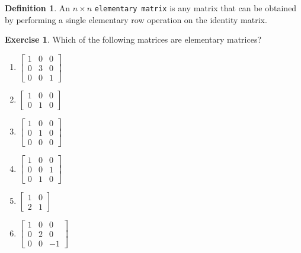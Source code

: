 \documentclass[handout]{beamer}
\newcommand{\fn}{\insertframenumber}
\theoremstyle{definition}
\newtheorem{exercise}{Exercise}
\newtheorem*{defn}{Definition}
\renewcommand{\emph}[1]{{\color{blue}\texttt{#1}}}
\begin{document}
\begin{frame}{\fn}
	\begin{defn}
		An $n\times n$ \emph{elementary matrix} is any matrix that can be obtained by performing a single elementary row operation on the identity matrix.
	\end{defn}
	\begin{exercise}
		Which of the following matrices are elementary matrices?
		\begin{multicols}{2}
			\begin{enumerate}[label=(\alph*)]
				\item $\begin{bmatrix}1&0&0\\0&3&0\\0&0&1\end{bmatrix}$
				\item $\begin{bmatrix}1&0&0\\0&1&0\end{bmatrix}$
				\item $\begin{bmatrix}1&0&0\\0&1&0\\0&0&0\end{bmatrix}$
				\item $\begin{bmatrix}1&0&0\\0&0&1\\0&1&0\end{bmatrix}$
				\item $\begin{bmatrix}1&0\\2&1\end{bmatrix}$
				\item $\begin{bmatrix}1&0&0\\0&2&0\\0&0&-1\end{bmatrix}$
			\end{enumerate}
		\end{multicols}
	\end{exercise}
\end{frame}
\end{document}
